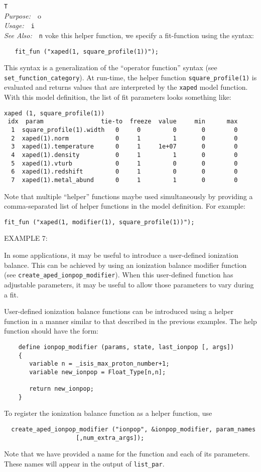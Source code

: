 \documentclass{book}
\makeatletter
\newif\ifpdf
\newenvironment{isisfunction}[4]%
{\index{{#1}@{\tt #1}}%
  \ifpdf
  \else
     \addcontentsline{toc}{subsection}{{#1} -- {#2}}
  \fi
  \vbox{
          \vspace*{\baselineskip}
          {\LARGE\tt #1}\vspace*{\baselineskip}\\
          {{\it Purpose:}~~{#2}}\\
          {{\it Usage:}~~{\tt #3}}\\
          {{\it See Also:}~~{\tt #4}}
       }
}%
{ }
\makeatother
\begin{document}
\begin{isisfunction}
To invoke this helper function, we specify a fit-function using the syntax:
\begin{verbatim}
   fit_fun ("xaped(1, square_profile(1))");
\end{verbatim}
This syntax is a generalization of the ``operator function'' syntax (see
\verb|set_function_category|).  At run-time, the helper function
\verb|square_profile(1)| is evaluated and returns values that are interpreted
by the \verb|xaped| model function. With this model definition, the list of
fit parameters looks something like:
\begin{verbatim}
xaped (1, square_profile(1))
 idx  param                tie-to  freeze  value     min      max
  1  square_profile(1).width   0     0         0       0        0
  2  xaped(1).norm             0     1         1       0        0
  3  xaped(1).temperature      0     1     1e+07       0        0
  4  xaped(1).density          0     1         1       0        0
  5  xaped(1).vturb            0     1         0       0        0
  6  xaped(1).redshift         0     1         0       0        0
  7  xaped(1).metal_abund      0     1         1       0        0
\end{verbatim}

Note that multiple ``helper'' functions maybe used simultaneously by providing
a comma-separated list of helper functions in the model definition.  For
example:
\begin{verbatim}
fit_fun ("xaped(1, modifier(1), square_profile(1))");
\end{verbatim}

EXAMPLE 7:

In some applications, it may be useful to introduce a user-defined ionization
balance.  This can be achieved by using an ionization balance modifier
function (see \verb|create_aped_ionpop_modifier|). When this user-defined
function has adjustable parameters, it may be useful to allow those parameters
to vary during a fit.

User-defined ionization balance functions can be introduced using a helper
function in a manner similar to that described in the previous examples.
The help function should have the form:
\begin{verbatim}
    define ionpop_modifier (params, state, last_ionpop [, args])
    {
       variable n = _isis_max_proton_number+1;
       variable new_ionpop = Float_Type[n,n];

       return new_ionpop;
    }
\end{verbatim}
To register the ionization balance function as a helper function, use
\begin{verbatim}
  create_aped_ionpop_modifier ("ionpop", &ionpop_modifier, param_names
                    [,num_extra_args]);
\end{verbatim}
Note that we have provided a name for the function and each of its parameters.
These names will appear in the output of \verb|list_par|.


\end{isisfunction}
\end{document}
